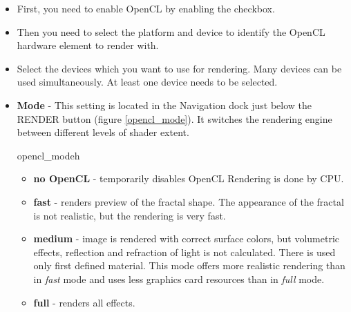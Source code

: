 \begin{itemize}
	\item First, you need to enable OpenCL by enabling the checkbox.
	
	\item Then you need to select the platform and device to identify the OpenCL hardware 
		element to render with.
		
	\item Select the devices which you want to use for rendering. Many devices can be used simultaneously. At least one device needs to be selected.
	\item \textbf{Mode} - This setting is located in the Navigation dock just below the RENDER button (figure \ref{opencl_mode}). It switches the rendering engine between different levels of shader extent.
	
	{opencl_mode}{h}
	
\begin{itemize}
	\item  \textbf{no OpenCL} - temporarily disables OpenCL  Rendering is done by CPU.
	\item  \textbf{fast} - renders preview of the fractal shape. The appearance of the fractal is not realistic, but the rendering is very fast.
	\item  \textbf{medium} - image is rendered with correct surface colors, but volumetric effects, reflection and refraction of light is not calculated. There is used only first defined material. This mode offers more realistic rendering than in \emph{fast} mode and uses less graphics card resources than in \emph{full} mode. 
	\item  \textbf{full} - renders all effects.	
\end{itemize}


\end{itemize}

